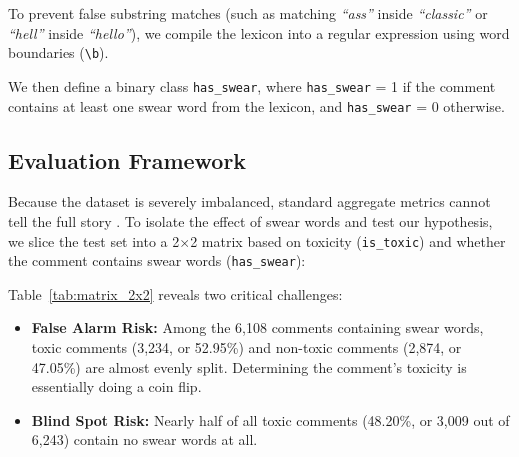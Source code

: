 \documentclass[11pt]{article}
\begin{document}
To prevent false substring matches (such as matching \textit{``ass''}
  inside \textit{``classic''} or \textit{``hell''} inside
\textit{``hello''}), we compile the lexicon into a regular expression
using word boundaries (\texttt{\textbackslash b}).

We then define a binary class \texttt{has\_swear}, where
\texttt{has\_swear} = 1 if the comment contains at least one swear
word from the lexicon, and \texttt{has\_swear} = 0 otherwise.

\subsection{Evaluation Framework}

Because the dataset is severely imbalanced, standard aggregate
metrics cannot tell the full story
\citep{rottger-etal-2021-hatecheck}. To isolate the effect of swear
words and test our hypothesis, we slice the test set into a
2$\times$2 matrix based on toxicity (\texttt{is\_toxic}) and whether
the comment contains swear words (\texttt{has\_swear}):

\begin{table}[ht]
  \centering
  \caption{Test set comment distribution across toxicity and swear
  word presence ($N = 63,978$).}
  \label{tab:matrix_2x2}
\end{table}

Table~\ref{tab:matrix_2x2} reveals two critical challenges:
\begin{itemize}
  \item \textbf{False Alarm Risk:} Among the 6,108 comments containing
    swear words, toxic comments (3,234, or 52.95\%) and non-toxic
    comments (2,874, or 47.05\%) are almost evenly split. Determining
    the comment's toxicity is essentially doing a coin flip.
  \item \textbf{Blind Spot Risk:} Nearly half of all toxic comments
    (48.20\%, or 3,009 out of 6,243) contain no swear words at all.
\end{itemize}
\end{document}
